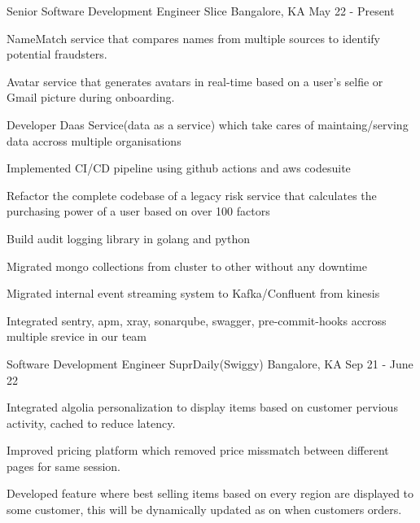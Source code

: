 \begin{cventries}
  \cventry
    {Senior Software Development Engineer}
    {Slice}
    {Bangalore, KA}
    {May 22 - Present}
    {
      \begin{cvitems}
        \item {NameMatch service that compares names from multiple sources to identify potential fraudsters.}
        \item {Avatar service that generates avatars in real-time based on a user's selfie or Gmail picture during onboarding.}
        \item {Developer Daas Service(data as a service) which take cares of maintaing/serving data accross multiple organisations}
        \item {Implemented CI/CD pipeline using github actions and aws codesuite}
        \item {Refactor the complete codebase of a legacy risk service that calculates the purchasing power of a user based on over 100 factors}
        \item {Build audit logging library in golang and python}
        \item {Migrated mongo collections from cluster to other without any downtime}
        \item {Migrated internal event streaming system to Kafka/Confluent from kinesis}
        \item {Integrated sentry, apm, xray, sonarqube, swagger, pre-commit-hooks accross multiple srevice in our team}
      \end{cvitems}
    }
  
  \cventry
    {Software Development Engineer}
    {SuprDaily(Swiggy)}
    {Bangalore, KA}
    {Sep 21 - June 22}
    {
      \begin{cvitems}
        \item {Integrated algolia personalization to display items based on customer pervious activity, cached to reduce latency.}
        \item {Improved pricing platform which removed price missmatch between different pages for same session.}
        \item {Developed feature where best selling items based on every region are displayed to some customer, this will be dynamically updated as on when customers orders.}
      \end{cvitems}
    }
  

\end{cventries}
